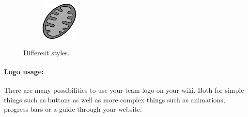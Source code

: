 \begin{figure}[H]
\begin{subfigure}[t]{0.75\linewidth}
        \includegraphics[width=0.2\textwidth]{chapters/images/mitochondria-greyscale}\hfill
    \end{subfigure}
    \caption{Different styles.}
    \label{fig:diff-styles}
\end{figure}

\paragraph{Logo usage:} There are many possibilities to use your team logo on your wiki.
Both for simple things such as buttons as well as more complex things such as animations, progress bars or a guide through your website.

